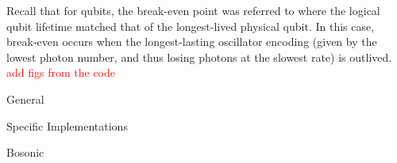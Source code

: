 Recall that for qubits, the break-even point was referred to where the logical qubit lifetime matched that of the longest-lived physical qubit. In this case, break-even occurs when the longest-lasting oscillator encoding (given by the lowest photon number, and thus losing photons at the slowest rate) is outlived.
\textcolor{red}{add figs from the code}

\clearpage

General \cite{Girvin2021} \cite{Andersen2020} \cite{Gottesman2009} \cite{Roffe2019} \cite{devitt}

Specific Implementations \cite{Krinner2021} \cite{Chen2021} \cite{cleland2022}

Bosonic \cite{campagne2020} \cite{Lau2016} \cite{Chuang1997} \cite{Terhal2020} \cite{Blais2020} \cite{Hu2019} \cite{Michael2016} \cite{Grimsmo2021} \cite{Cai2021} \cite{Brady2023} \cite{lachance2023}